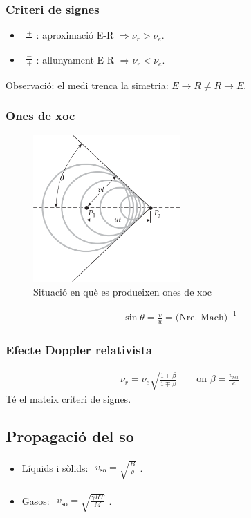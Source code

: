 \subsubsection*{Criteri de signes}
\begin{itemize}
    \item $\begin{gathered} \frac{+}{-} \end{gathered}$: aproximació E-R $\Rightarrow \nu_{r} > \nu_{e}$.
    \item $\begin{gathered} \frac{-}{+} \end{gathered}$: allunyament E-R $\Rightarrow \nu_{r} < \nu_{e}$.
\end{itemize}
Observació: el medi trenca la simetria: $E \to R \neq R \to E$.
\subsubsection*{Ones de xoc}
\begin{figure}[H]
\centering
    \includegraphics[width=0.5\textwidth]{images/2/28-ones-xoc.png}
\caption{Situació en què es produeixen ones de xoc}
\end{figure}
\begin{align}
    \boxed{\sin \theta = \frac{v}{u} = \text{(Nre. Mach)}^{-1}}
\end{align}

\subsubsection*{Efecte Doppler relativista}
\begin{align}
    \boxed{\nu_{r} = \nu_{e} \sqrt{\frac{1 \pm \beta}{1 \mp \beta}}} \qquad \text{on } \beta = \frac{v_{rel}}{c}
\end{align}
Té el mateix criteri de signes.
\subsection{Propagació del so}
\begin{itemize}
    \item Líquids i sòlids: $\begin{gathered} v_{\text{so}} = \sqrt{\frac{B}{\rho}} \end{gathered}$.
    \item Gasos: $\begin{gathered} v_{\text{so}} = \sqrt{\frac{\gamma RT}{M}} \end{gathered}$.
\end{itemize}
